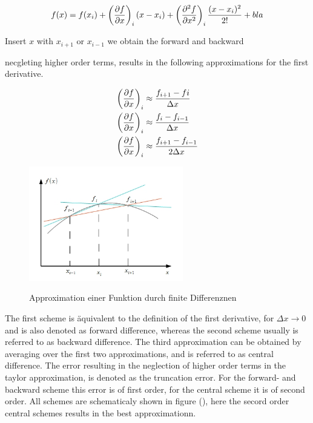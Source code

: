 \begin{align}
    f(x) = f(x_i) + \left(\pdn[f]{x} \right)_i (x - x_i) + \left(\pdn[^2f]{x^2}\right)_i \frac{(x-x_i)^2}{2!} + bla
\end{align}

Insert $x$ with $x_{i+1}$ or $x_{i-1}$ we obtain the forward and backward

 necgleting higher order terms, results in the following approximations for the first derivative.

\begin{align}
    \left(\pdn[f]{x}\right)_i &\approx \frac{f_{i+1} - f{i}}{\Delta x}\\
    \left(\pdn[f]{x}\right)_i &\approx \frac{f_{i} - f_{i-1}}{\Delta x}\\
    \left(\pdn[f]{x}\right)_i &\approx \frac{f_{i+1} - f_{i-1}}{2\Delta x}
\end{align}

\begin{figure}[!tpb]
  \centering
  \includegraphics[width=0.6\textwidth]{gfx/numerik/fd_dummy.png}\label{fig:fd_schema}
  \caption{Approximation einer Funktion durch finite Differenznen}
\end{figure}

The first scheme is äquivalent to the definition of the first derivative, for $\Delta x \rightarrow 0$ and is also
denoted as forward difference, whereas the second scheme usually is referred to as backward difference.
The third approximation can be obtained by averaging over the first two approximations, and  is referred to as central difference.
The error resulting in the neglection of higher order terms in the taylor approximation, is denoted as the truncation error.
For the forward- and backward scheme this error is of first order, for the central scheme it is of second order.
All schemes are schematicaly shown in figure (), here the secord order central schemes results in the best approximationn.

